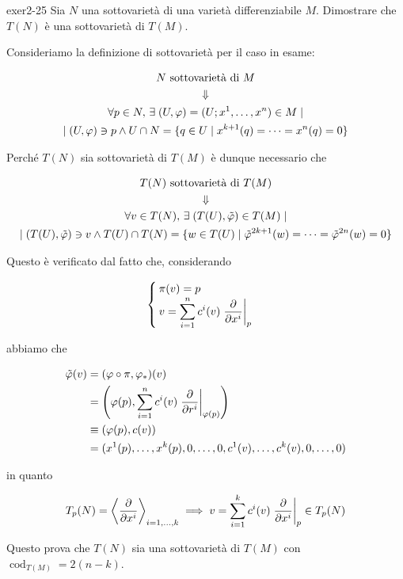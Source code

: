 {exer2-25}
{
Sia $ N $ una sottovarietà di una varietà differenziabile $ M $. Dimostrare che $ T(N) $ è una sottovarietà di $ T(M) $.
}
{
Consideriamo la definizione di sottovarietà per il caso in esame:

\begin{gather}
	N \text{ sottovarietà di } M \nonumber \\
	\Downarrow \\
	\forall p \in N, \, \exists \; (U,\varphi) = (U; x^{1}, \dots, x^{n}) \in M \mid \nonumber \\
	\mid (U,\varphi) \ni p \wedge U \cap N = \{ q \in U \mid x^{k+1}(q) = \dots = x^{n}(q) = 0 \} \nonumber
\end{gather}

Perché $ T(N) $ sia sottovarietà di $ T(M) $ è dunque necessario che

\begin{gather}
	T(N) \text{ sottovarietà di } T(M) \nonumber \\
	\Downarrow \\
	\forall v \in T(N), \, \exists \; (T(U),\tilde{\varphi}) \in T(M) \mid \nonumber \\
	\mid (T(U),\tilde{\varphi}) \ni v \wedge T(U) \cap T(N) = \{ w \in T(U) \mid \tilde{\varphi}^{2k+1}(w) = \dots = \tilde{\varphi}^{2n}(w) = 0 \} \nonumber
\end{gather}

Questo è verificato dal fatto che, considerando

\begin{equation}
	\begin{cases}
		\pi(v) = p \\
		v = \displaystyle\sum_{i=1}^{n} c^{i}(v) \eval{\pdv{x^{i}}}_{p}
	\end{cases}
\end{equation}

abbiamo che

\begin{align}
	\begin{split}
		\tilde{\varphi}(v) &= (\varphi \circ \pi, \varphi_{*})(v) \\
		&= \left( \varphi(p), \sum_{i=1}^{n} c^{i}(v) \eval{\pdv{r^{i}}}_{\varphi(p)} \right) \\
		&\equiv \left( \varphi(p), c(v) \right) \\
		&= ( x^{1}(p), \dots, x^{k}(p), 0, \dots, 0, c^{1}(v), \dots, c^{k}(v), 0, \dots, 0 )
	\end{split}
\end{align}

in quanto

\begin{equation}
	T_{p}(N) = \ev{ \pdv{x^{i}} }_{i=1,\dots,k} %
	\implies %
	v = \sum_{i=1}^{k} c^{i}(v) \eval{\pdv{x^{i}}}_{p} \in T_{p}(N)
\end{equation}

Questo prova che $ T(N) $ sia una sottovarietà di $ T(M) $ con $ \operatorname{cod}_{T(M)} = 2(n-k) $.
}

